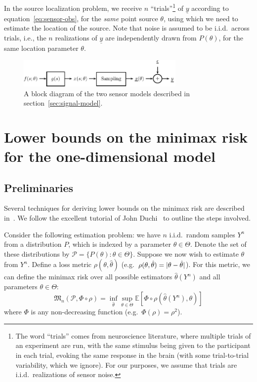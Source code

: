 \documentclass[conference,letterpaper]{IEEEtran}
\providecommand{\v}{}
\renewcommand{\v}[1]{\underline{#1}}
\DeclarePairedDelimiter\abs{\lvert}{\rvert}
\newcommand{\Phiorho}{\Phi\!\circ\!\rho}
\begin{document}
In the source localization problem, we receive $n$ ``trials''\footnote{The word
	``trials'' comes from neuroscience literature, where multiple trials of an
	experiment are run, with the same stimulus being given to the participant
	in each trial, evoking the same response in the brain (with some
trial-to-trial variability, which we ignore). For our purposes, we assume that
trials are i.i.d.\ realizations of sensor noise.} of $\v y$ according to
equation~\eqref{eq:sensor-obs}, for the \emph{same} point source $\theta$,
using which we need to estimate the location of the source. Note that noise is
assumed to be i.i.d.\ across trials, i.e., the $n$ realizations of $\v y$ are
independently drawn from $P(\theta)$, for the same location parameter $\theta$.

\begin{figure}[tp] %
	\centering
	\includegraphics[width=3.2in]{block-diagram}
	\caption{A block diagram of the two sensor models described in
	section~\ref{sec:signal-model}.}
	\label{fig:signal-model}
\end{figure}

\section{Lower bounds on the minimax risk for the one-dimensional model}
\label{sec:minimax-lower-bounds}

\subsection{Preliminaries}

Several techniques for deriving lower bounds on the minimax risk are described
in~\cite{Tsybakov2009Introduction}. We follow the excellent tutorial of John
Duchi~\cite{Duchi2015Information} to outline the steps involved.

Consider the following estimation problem: we have $n$ i.i.d.\ random samples
$Y^n$ from a distribution $P$, which is indexed by a parameter $\theta \in
\Theta$.  Denote the set of these distributions by $\mathcal{P} = \{P(\theta) :
\theta \in \Theta\}$. Suppose we now wish to estimate $\theta$ from $Y^n$.
Define a loss metric $\rho(\theta, \hat\theta)$ (e.g.\ $\rho(\theta,
\hat\theta) = \abs{\theta - \hat\theta}$). For this metric, we can define the
minimax risk over all possible estimators $\hat\theta(Y^n)$ and all parameters
$\theta \in \Theta$:
\begin{equation} \label{eq:minimax-expr}
	\mathfrak{M}_n(\mathcal{P}, \Phiorho) = \inf_{\hat\theta} \sup_{\theta \in \Theta} \mathbb E[\Phiorho (\hat\theta(Y^n), \theta)]
\end{equation}
where $\Phi$ is any non-decreasing function (e.g.\ $\Phi(\rho) = \rho^2$).
\end{document}
